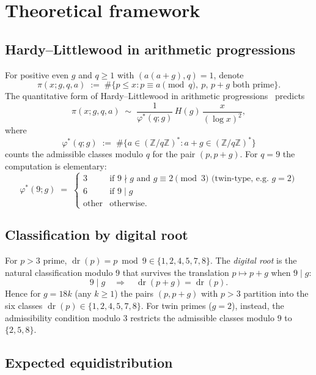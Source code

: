 \documentclass[11pt]{amsart}
\theoremstyle{plain}
\theoremstyle{definition}
\theoremstyle{remark}
\DeclareMathOperator{\dr}{dr}
\begin{document}
\section{Theoretical framework}\label{sec:framework}

\subsection{Hardy--Littlewood in arithmetic progressions}

For positive even $g$ and $q \ge 1$ with $(a(a+g),q)=1$, denote
\[
  \pi(x;g,q,a) \;:=\; \#\bigl\{p \le x : p \equiv a \pmod q,\ p,\,p+g
  \text{ both prime}\bigr\}.
\]
The quantitative form of Hardy--Littlewood in arithmetic
progressions~\cite[\S 5]{IK04} predicts
\begin{equation}\label{eq:HL_AP}
  \pi(x;g,q,a) \;\sim\; \frac{1}{\varphi^*(q;g)}\, H(g) \,\frac{x}{(\log x)^2},
\end{equation}
where
\begin{equation}\label{eq:phi_star}
  \varphi^*(q;g) \;:=\; \#\bigl\{a \in (\mathbb{Z}/q\mathbb{Z})^*
  : a + g \in (\mathbb{Z}/q\mathbb{Z})^*\bigr\}
\end{equation}
counts the admissible classes modulo $q$ for the pair $(p,p+g)$. For
$q=9$ the computation is elementary:
\[
  \varphi^*(9;g) \;=\;
  \begin{cases}
    3 & \text{if } 9 \nmid g \text{ and } g \equiv 2 \!\!\!\pmod 3
    \text{ (twin-type, e.g.\ } g=2\text{)} \\
    6 & \text{if } 9 \mid g \\
    \text{other} & \text{otherwise.}
  \end{cases}
\]

\subsection{Classification by digital root}

For $p > 3$ prime, $\dr(p) = p \bmod 9 \in \{1,2,4,5,7,8\}$.
The \emph{digital root} is the natural classification modulo $9$ that
survives the translation $p \mapsto p+g$ when $9 \mid g$:
\[
  9 \mid g \quad\Longrightarrow\quad \dr(p+g) = \dr(p).
\]
Hence for $g = 18k$ (any $k \ge 1$) the pairs $(p,p+g)$ with $p > 3$
partition into the six classes $\dr(p) \in \{1,2,4,5,7,8\}$. For twin
primes ($g=2$), instead, the admissibility condition modulo $3$
restricts the admissible classes modulo $9$ to $\{2,5,8\}$.

\subsection{Expected equidistribution}
\end{document}
